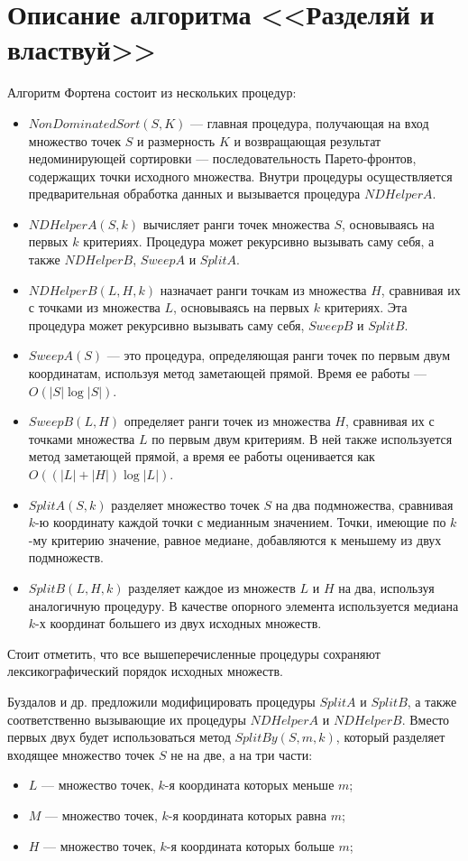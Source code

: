 \section{Описание алгоритма <<Разделяй и властвуй>>}
Алгоритм Фортена состоит из нескольких процедур:
\begin{itemize}
    \item $NonDominatedSort(S, K)$ --- главная процедура, получающая на вход множество точек $S$ и размерность $K$ и возвращающая результат недоминирующей сортировки --- последовательность Парето-фронтов, содержащих точки исходного множества. Внутри процедуры осуществляется предварительная обработка данных и вызывается процедура $NDHelperA$.
    \item $NDHelperA(S, k)$ вычисляет ранги точек множества $S$, основываясь на первых $k$ критериях. Процедура может рекурсивно вызывать саму себя, а также $NDHelperB$, $SweepA$ и $SplitA$.
    \item $NDHelperB(L, H, k)$ назначает ранги точкам из множества $H$, сравнивая их с точками из множества $L$, основываясь на первых $k$ критериях. Эта процедура может рекурсивно вызывать саму себя, $SweepB$ и $SplitB$.
    \item $SweepA(S)$ --- это процедура, определяющая ранги точек по первым двум координатам, используя метод заметающей прямой. Время ее работы --- $O(|S|\log|S|)$.
    \item $SweepB(L, H)$ определяет ранги точек из множества $H$, сравнивая их с точками множества $L$ по первым двум критериям. В ней также используется метод заметающей прямой, а время ее работы оценивается как $O((|L| + |H|)\log{|L|})$.
    \item $SplitA(S, k)$ разделяет множество точек $S$ на два подмножества, сравнивая $k$-ю координату каждой точки с медианным значением. Точки, имеющие по $k$-му критерию значение, равное медиане, добавляются к меньшему из двух подмножеств.
    \item $SplitB(L, H, k)$ разделяет каждое из множеств $L$ и $H$ на два, используя аналогичную процедуру. В качестве опорного элемента используется медиана $k$-х координат большего из двух исходных множеств.
\end{itemize}
Стоит отметить, что все вышеперечисленные процедуры сохраняют лексикографический порядок исходных множеств.

Буздалов и др. предложили модифицировать процедуры $SplitA$ и $SplitB$, а также соответственно вызывающие их процедуры $NDHelperA$ и $NDHelperB$. Вместо первых двух будет использоваться метод $SplitBy(S, m, k)$, который разделяет входящее множество точек $S$ не на две, а на три части:
\begin{itemize}
    \item $L$ --- множество точек, $k$-я координата которых меньше $m$;
    \item $M$ --- множество точек, $k$-я координата которых равна $m$;
    \item $H$ --- множество точек, $k$-я координата которых больше $m$;
\end{itemize}

